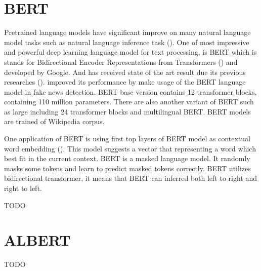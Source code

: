 
\section{BERT}
Pretrained language models have significant improve on many natural language model tasks such as natural language inference task (\cite{bert}). One of most impressive and powerful deep learning language model for text processing, is BERT which is stands for Bidirectional Encoder
Representations from Transformers (\cite{bert}) and developed by Google. And has received state of the art result due its previous researches (\cite{bert}). \cite{spotfake} improved its performance by make usage of the BERT language model in fake news detection. BERT base version contains 12 transformer blocks, containing 110 million parameters. There are also another variant of BERT such as large including 24 transformer blocks and multilingual BERT. BERT models are trained of Wikipedia corpus. 

One application of BERT is using first top layers of BERT model as contextual word embedding (\cite{book_datafake}). This model suggests a vector that representing a word which best fit in the current context.  BERT is a masked language model. It randomly masks some tokens and learn to predict masked tokens correctly. BERT utilizes bidirectional transformer, it means that BERT can inferred both left to right and right to left.

   
{\color{green}TODO}

\section{ALBERT}
{\color{green}TODO}

\begin{comment}
{\color{orange} This chapter typically includes: }

\begin{itemize}
    \item Establishes the context of the research
    \item Outlines the historical developments in the literature that led to the current topic of research concisely.
    \item Briefly highlight the main developments of their research topic and identify the main gaps that need to be addressed.
    \item Provide general information about the topic of the research and emphasize the main aims of the study. 
    \item Summary of my interpretation of previous research and what my study proposes to accomplish.
\end{itemize}


{\color{orange}Extra points:}
\begin{itemize}

    \item Only discuss the main and relevant aspects of the studies that have led to project aims.
    \item Build a story around the central theme of the research.

\end{itemize}
\end{comment}
